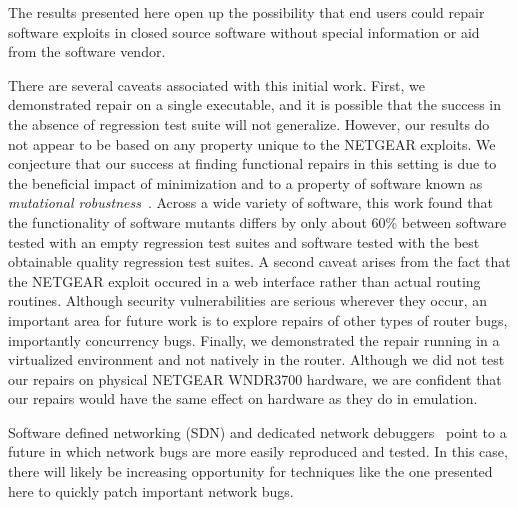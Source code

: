 \documentclass{sigcomm-alternate}
\begin{document}
The results presented here open up the possibility that end users
could repair software exploits in closed source software without
special information or aid from the software vendor.  

There are several caveats associated with this initial work.
First, we demonstrated repair on a single executable, and it is possible
that the success in the absence of regression test suite will not
generalize.  However, our results do not appear to be based on any
property unique to the NETGEAR exploits.  We conjecture that our
success at finding functional repairs in this setting is due to the
beneficial impact of minimization and to a property of software known
as \emph{mutational robustness}~\cite{schulte2013software}.  Across a
wide variety of software, this work found that the functionality of
software mutants differs by only about 60\% between software tested
with an empty regression test suites and software tested with the best
obtainable quality regression test suites.  A second caveat arises
from the fact that the NETGEAR exploit occured in a web interface
rather than actual routing routines.  Although security
vulnerabilities are serious wherever they occur, an important
area for future work is to explore repairs of other types of router
bugs, importantly concurrency bugs.  Finally, we demonstrated the
repair running in a virtualized environment and not natively in the
router.  Although we did not test our repairs
on physical NETGEAR WNDR3700 hardware, we are confident that our
repairs would have the same effect on hardware as they do in emulation.

Software defined networking (SDN) and dedicated network
debuggers~\cite{handigol2012debugger} point to a future in which
network bugs are more easily reproduced and tested.  In this
case, there will likely be increasing opportunity for techniques
like the one presented here to quickly patch important network bugs.

\end{document}
